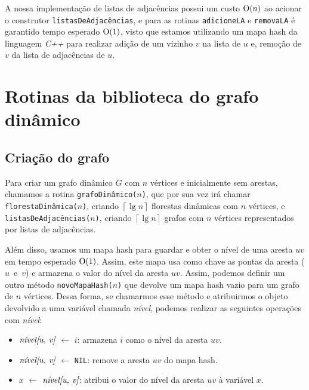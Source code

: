 A nossa implementação \cite{chung2025} de listas de adjacências possui um custo $\mathrm{O}(n)$ ao acionar o construtor \texttt{listasDeAdjacências}, e para 
as rotinas \texttt{adicioneLA} e \texttt{removaLA} é garantido tempo esperado $\mathrm{O}(1)$, visto que estamos utilizando um mapa hash da linguagem \textit{C++} para realizar adição de um vizinho $v$ na lista de $u$ e, remoção de $v$ da lista de adjacências de $u$.

\section{Rotinas da biblioteca do grafo dinâmico}
\label{sec:dynamic-graph-routines}

\subsection{Criação do grafo}
\label{sec:dynamic-graph-creation}

Para criar um grafo dinâmico $G$ com $n$ vértices e inicialmente sem arestas, chamamos a rotina \texttt{grafoDinâmico($n$)}, que por sua vez irá chamar \texttt{florestaDinâmica($n$)}, criando $\left\lceil \lg n \right\rceil$ florestas dinâmicas com $n$ vértices, e \texttt{listasDeAdjacências($n$)}, criando $\left\lceil \lg n \right\rceil$ grafos com $n$ vértices representados por listas de adjacências. 

Além disso, usamos um mapa hash para guardar e obter o nível de uma aresta $uv$ em tempo esperado $\mathrm{O}(1)$. Assim, este mapa usa como chave as pontas da aresta ($u$~e~$v$) e armazena o valor do nível da aresta $uv$. Assim, podemos definir um outro método \texttt{novoMapaHash($n$)} que devolve um mapa hash vazio para um grafo de $n$ vértices. Dessa forma, se chamarmos esse método e atribuirmos o objeto devolvido a uma variável chamada \textit{nível}, podemos realizar as seguintes operações com \textit{nível}:

\begin{itemize}
    \item $\emph{nível[u, v]}$ $\leftarrow$ $i$: armazena $i$ como o nível da aresta $uv$.
    
    \item $\emph{nível[u, v]}$ $\leftarrow$ \texttt{NIL}: remove a aresta $uv$ do mapa hash.
    
    \item $x$ $\leftarrow$ $\emph{nível[u, v]}$: atribui o valor do nível da aresta $uv$ à variável $x$. 
\end{itemize}

